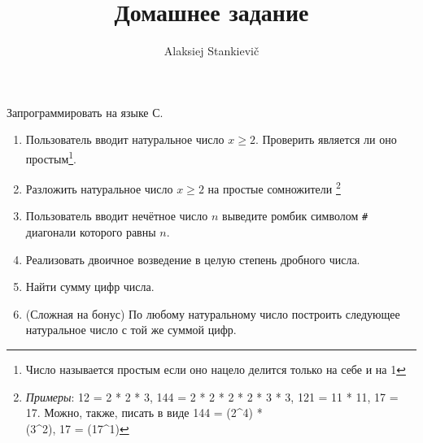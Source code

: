 \documentclass[12pt]{article}
\author{Alaksiej Stankievič}
\title{Домашнее задание}
\begin{document}


 Запрограммировать на языке С.
 \begin{enumerate}
  \item Пользователь вводит натуральное число $x\geq{}2$. Проверить является ли оно простым\footnote{Число называется простым если оно нацело делится только на себе и на 1}.
 \item Разложить натуральное число $x\geq{}2$ на простые сомножители  
 \footnote{\textit{Примеры}: 12 = 2 * 2 * 3,  144 = 2 * 2 * 2 * 2 * 3 * 3, 121 = 11 * 11, 17 = 17. Можно, также, писать в виде 144 = (2\textasciicircum4) *\\ (3\textasciicircum2), 17 = (17\textasciicircum1)}
  \item Пользователь вводит нечётное число $n$ выведите ромбик символом \verb|#| диагонали которого равны $n$.
  \item Реализовать двоичное возведение в целую степень дробного числа.
  \item Найти сумму цифр числа.
  \item (Сложная на бонус) По любому натуральному число построить следующее натуральное число с той же суммой цифр.
 \end{enumerate}
\end{document}
